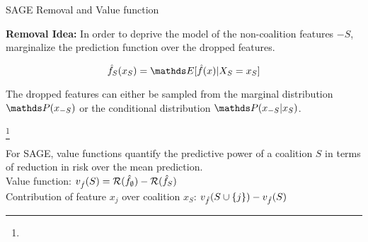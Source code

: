 \documentclass[11pt,compress,t,notes=noshow, aspectratio=169, xcolor=table]{beamer}
\begin{document}
\begin{vbframe}{SAGE Removal and Value function}
  
 \textbf{Removal Idea:} In order to deprive the model of the non-coalition features $-S$, marginalize the prediction function over the dropped features.

$$\fh_S(x_S) = \E[\fh(x) | X_S = x_S]$$
  
The dropped features can either be sampled from the marginal distribution $\P(x_{-S})$ or the conditional distribution $\P(x_{-S}|x_S)$.\\
\lz

\footnote[frame]{}

For SAGE, value functions quantify the predictive power of a coalition $S$ in terms of reduction in risk over the mean prediction.\\
\lz
Value function:  $ v_{\hat{f}}(S) = \mathcal{R}(\hat{f}_{\emptyset}) - \mathcal{R}(\hat{f}_{S})$\\
\lz
Contribution of feature $x_j$ over coalition $x_S$:  $v_{\hat{f}}(S \cup \{j\}) - v_{\hat{f}}(S)$\\
\lz

\end{vbframe}
\end{document}
